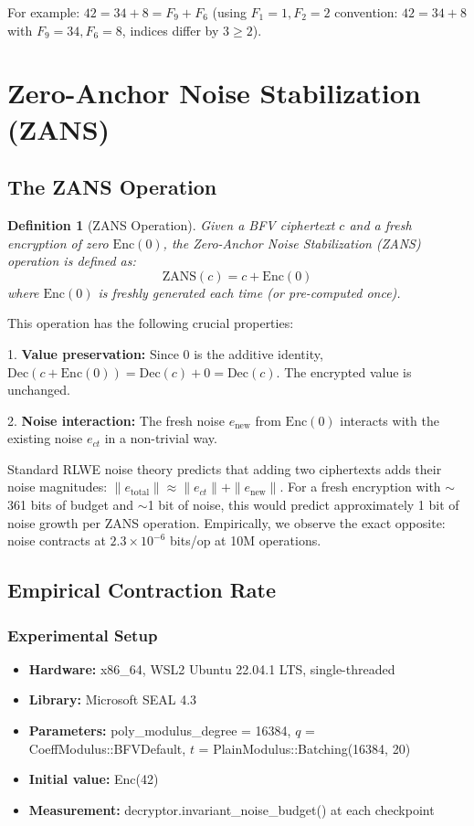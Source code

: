 \documentclass[11pt]{article}
\newtheorem{definition}{Definition}
\begin{document}
For example: $42 = 34 + 8 = F_9 + F_6$ (using $F_1 = 1, F_2 = 2$ convention: $42 = 34 + 8$ with $F_9 = 34, F_6 = 8$, indices differ by $3 \geq 2$).

\section{Zero-Anchor Noise Stabilization (ZANS)}

\subsection{The ZANS Operation}

\begin{definition}[ZANS Operation]
Given a BFV ciphertext $c$ and a fresh encryption of zero $\text{Enc}(0)$, the Zero-Anchor Noise Stabilization (ZANS) operation is defined as:
\begin{equation}
\text{ZANS}(c) = c + \text{Enc}(0)
\end{equation}
where $\text{Enc}(0)$ is freshly generated each time (or pre-computed once).
\end{definition}

This operation has the following crucial properties:

1. \textbf{Value preservation:} Since 0 is the additive identity, $\text{Dec}(c + \text{Enc}(0)) = \text{Dec}(c) + 0 = \text{Dec}(c)$. The encrypted value is unchanged.

2. \textbf{Noise interaction:} The fresh noise $e_{\text{new}}$ from $\text{Enc}(0)$ interacts with the existing noise $e_{ct}$ in a non-trivial way.

Standard RLWE noise theory predicts that adding two ciphertexts adds their noise magnitudes: $\|e_{\text{total}}\| \approx \|e_{ct}\| + \|e_{\text{new}}\|$. For a fresh encryption with $\sim$361 bits of budget and $\sim$1 bit of noise, this would predict approximately 1 bit of noise growth per ZANS operation. Empirically, we observe the exact opposite: noise contracts at $2.3 \times 10^{-6}$ bits/op at 10M operations.

\subsection{Empirical Contraction Rate}

\subsubsection{Experimental Setup}
\begin{itemize}
    \item \textbf{Hardware:} x86\_64, WSL2 Ubuntu 22.04.1 LTS, single-threaded
    \item \textbf{Library:} Microsoft SEAL 4.3
    \item \textbf{Parameters:} poly\_modulus\_degree = 16384, $q$ = CoeffModulus::BFVDefault, $t$ = PlainModulus::Batching(16384, 20)
    \item \textbf{Initial value:} Enc(42)
    \item \textbf{Measurement:} decryptor.invariant\_noise\_budget() at each checkpoint
\end{itemize}
\end{document}
